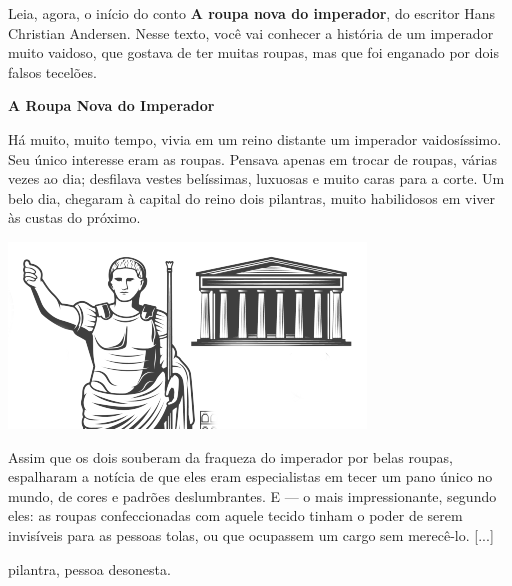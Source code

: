 Leia, agora, o início do conto \textbf{A roupa nova do imperador}, do 
escritor Hans Christian Andersen. Nesse texto, você vai conhecer a 
história de um imperador muito vaidoso, que gostava de ter muitas
roupas, mas que foi enganado por dois falsos tecelões.


\begin{myquote}
\textbf{A Roupa Nova do Imperador}

Há muito, muito tempo, vivia em um reino distante um imperador
vaidosíssimo. Seu único interesse eram as roupas. Pensava apenas em
trocar de roupas, várias vezes ao dia; desfilava vestes belíssimas,
luxuosas e muito caras para a corte. Um belo dia, chegaram à capital do
reino dois pilantras, muito habilidosos em viver às custas do próximo.

\begin{center}
\includegraphics[width=\textwidth]{media/image2.png}
\end{center}

Assim que os dois souberam da fraqueza do imperador por belas roupas,
espalharam a notícia de que eles eram especialistas em tecer um pano
único no mundo, de cores e padrões deslumbrantes. E --- o mais
impressionante, segundo eles: as roupas confeccionadas com aquele tecido
tinham o poder de serem invisíveis para as pessoas tolas, ou que
ocupassem um cargo sem merecê-lo. {[}...{]}\\

\begin{small}
 pilantra, pessoa desonesta.\\
\end{small}

\end{myquote}

